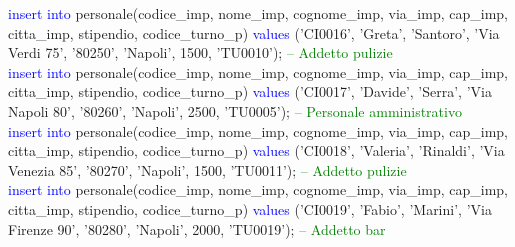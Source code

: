 \documentclass{article}
\begin{document}
\begin{flushleft}
{        \vspace{2mm}
        \hspace*{0.5em}\textcolor{blue}{insert into} personale(codice\_imp, nome\_imp, cognome\_imp, via\_imp, cap\_imp, \hspace*{0.5em}citta\_imp, stipendio, codice\_turno\_p) \textcolor{blue}{values} ('CI0016', 'Greta', 'Santoro', 'Via \hspace*{0.5em}Verdi 75', \hspace*{0.5em}'80250', 'Napoli', 1500, 'TU0010'); \hspace*{0.5em} \textcolor{green}{-- Addetto pulizie} \\
        \vspace{2mm}
        \hspace*{0.5em}\textcolor{blue}{insert into} personale(codice\_imp, nome\_imp, cognome\_imp, via\_imp, cap\_imp, \hspace*{0.5em}citta\_imp, stipendio, codice\_turno\_p) \textcolor{blue}{values} ('CI0017', 'Davide', 'Serra', 'Via \hspace*{0.5em}Napoli 80', \hspace*{0.5em}'80260', 'Napoli', 2500, 'TU0005'); \hspace*{0.5em} \textcolor{green}{-- Personale amministrativo} \\
        \vspace{2mm}
        \hspace*{0.5em}\textcolor{blue}{insert into} personale(codice\_imp, nome\_imp, cognome\_imp, via\_imp, cap\_imp, \hspace*{0.5em}citta\_imp, stipendio, codice\_turno\_p) \textcolor{blue}{values} ('CI0018', 'Valeria', 'Rinaldi', \hspace*{0.5em}'Via Venezia 85', \hspace*{0.5em}'80270', 'Napoli', 1500, 'TU0011'); \hspace*{0.5em} \textcolor{green}{-- Addetto pulizie} \\
        \vspace{2mm}
        \hspace*{0.5em}\textcolor{blue}{insert into} personale(codice\_imp, nome\_imp, cognome\_imp, via\_imp, cap\_imp, \hspace*{0.5em}citta\_imp, stipendio, codice\_turno\_p) \textcolor{blue}{values} ('CI0019', 'Fabio', 'Marini', 'Via \hspace*{0.5em}Firenze 90', \hspace*{0.5em}'80280', 'Napoli', 2000, 'TU0019'); \hspace*{0.5em} \textcolor{green}{-- Addetto bar} \\
}
\end{flushleft}
\end{document}
